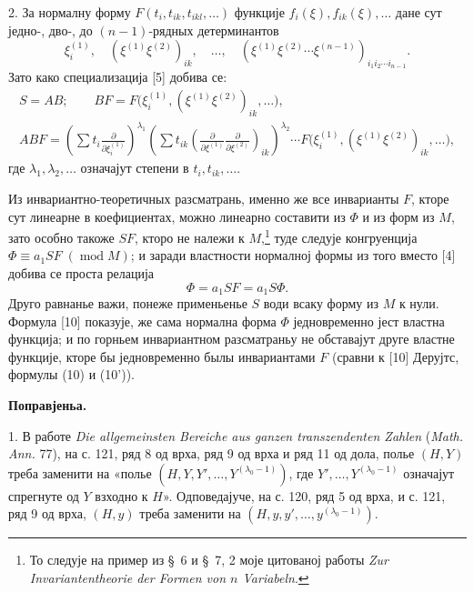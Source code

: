 \documentclass[11pt]{article}
\providecommand{\p}{\partial}
\providecommand{\modu}[1]{\;(\operatorname{mod} #1)}
\begin{document}
2. За нормалну форму \(F(t_i,t_{ik},t_{ikl},\ldots)\) функције \(f_i(\xi),f_{ik}(\xi),\ldots\) дане сут једно-, дво-, до \((n-1)\)-рядных детерминантов
\[
        \xi_i^{(1)},\quad (\xi^{(1)}\xi^{(2)})_{ik},\quad\ldots,\quad
        (\xi^{(1)}\xi^{(2)}\cdots\xi^{(n-1)})_{i_1i_2\cdots i_{n-1}}.
\]
Зато како специализација [5] добива се:
\[
\begin{gathered}
        S=AB;\qquad
        BF=F\bigl(\xi_i^{(1)},(\xi^{(1)}\xi^{(2)})_{ik},\ldots\bigr),\\
        ABF=\left(\sum t_i\frac{\p}{\p\xi_i^{(1)}}\right)^{\lambda_1}
        \left(\sum t_{ik}\left(\frac{\p}{\p\xi^{(1)}}\frac{\p}{\p\xi^{(2)}}\right)_{ik}\right)^{\lambda_2}
        \cdots F\bigl(\xi_i^{(1)},(\xi^{(1)}\xi^{(2)})_{ik},\ldots\bigr),
\end{gathered}
\]
где \(\lambda_1,\lambda_2,\ldots\) означајут степени в \(t_i,t_{ik},\ldots\).

Из инвариантно-теоретичных разсматрань, именно же все инварианты \(F\), кторе сут линеарне в коефициентах, можно линеарно составити из \(\Phi\) и из форм из \(M\), зато особно такоже \(SF\), кторо не належи к \(M\),\footnote{То следује на пример из \S~6 и \S~7, 2 моје цитованој работы \emph{Zur Invariantentheorie der Formen von \(n\) Variabeln}.} туде следује конгруенција \(\Phi\equiv a_1SF\modu{M}\); и заради властности нормалној формы из того вместо [4] добива се проста релација
\begin{equation}
        \Phi=a_1SF=a_1S\Phi.
\tag{10}
\end{equation}
Друго равнанье важи, понеже применьенье \(S\) води всаку форму из \(M\) к нули. Формула [10] показује, же сама нормална форма \(\Phi\) једновременно јест властна функција; и по горньем инвариантном разсматраньу не обставајут друге властне функције, кторе бы једновременно былы инвариантами \(F\) (сравни к [10] Дерујтс, формулы (10) и (10')).

\begin{center}
\textbf{Поправјеньа.}
\end{center}

1. В работе \emph{Die allgemeinsten Bereiche aus ganzen transzendenten Zahlen} (\emph{Math. Ann.} 77), на с. 121, ряд 8 од врха, ряд 9 од врха и ряд 11 од дола, полье \((H,Y)\) треба заменити на «полье \((H,Y,Y',\ldots,Y^{(\lambda_0-1)})\), где \(Y',\ldots,Y^{(\lambda_0-1)}\) означајут спрегнуте од \(Y\) взходно к \(H\)». Одповедајуче, на с. 120, ряд 5 од врха, и с. 121, ряд 9 од врха, \((H,y)\) треба заменити на \((H,y,y',\ldots,y^{(\lambda_0-1)})\).
\end{document}
